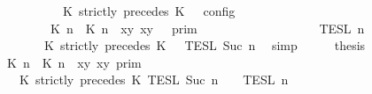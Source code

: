 \begin{isabellebody}
\ \ \ \ \ \ \ \ \ \ \ \ \ \ \ \ \ \ {\isasymturnstile}\ {\isasymPsi}\ {\isasymtriangleright}\ {\isacharparenleft}{\isacharparenleft}K\ strictly\ precedes\ K\ {\isacharhash}\ {\isasymPhi}{\isacharparenright}\ {\isasymrbrakk}\isactrlsub c\isactrlsub o\isactrlsub n\isactrlsub f\isactrlsub i\isactrlsub g\isanewline
\ \ \ \ \ \ \ \ \ \ \ \ \ \ \ \ {\isacharequal}\ {\isasymlbrakk}{\isasymlbrakk}\ {\isacharparenleft}{\isasymlceil}{\isacharhash}\isactrlsup {\isasymle}\ K\ n{\isacharcomma}\ {\isacharhash}\isactrlsup {\isacharless}\ K\ n{\isasymrceil}\ {\isasymin}\ {\isacharparenleft}{\isasymlambda}{\isacharparenleft}x{\isacharcomma}y{\isacharparenright}{\isachardot}\ x{\isasymle}y{\isacharparenright}{\isacharparenright}\ {\isacharhash}\ {\isasymGamma}\ {\isasymrbrakk}{\isasymrbrakk}\isactrlsub p\isactrlsub r\isactrlsub i\isactrlsub m\isanewline
\ \ \ \ \ \ \ \ \ \ \ \ \ \ \ \ {\isasyminter}\ {\isasymlbrakk}{\isasymlbrakk}\ {\isasymPsi}\ {\isasymrbrakk}{\isasymrbrakk}\isactrlsub T\isactrlsub E\isactrlsub S\isactrlsub L\isactrlbsup {\isasymge}\ n\isactrlesup \isanewline
\ \ \ \ \ \ \ \ \ \ \ \ \ \ \ \ {\isasyminter}\ {\isasymlbrakk}{\isasymlbrakk}\ {\isacharparenleft}K\ strictly\ precedes\ K\ {\isacharhash}\ {\isasymPhi}\ {\isasymrbrakk}{\isasymrbrakk}\isactrlsub T\isactrlsub E\isactrlsub S\isactrlsub L\isactrlbsup {\isasymge}\ Suc\ n\isactrlesup {\isacartoucheclose}\ \isamarkupfalse%
\ simp\isanewline
\ \ \isamarkupfalse%
\ \isamarkupfalse%
\ {\isacharquery}thesis\isanewline
\ \ \isamarkupfalse%
\ {\isacharminus}\isanewline
\ \ \ \ \isamarkupfalse%
\ {\isacartoucheopen}{\isasymlbrakk}\ {\isasymlceil}{\isacharhash}\isactrlsup {\isasymle}\ K\ n{\isacharcomma}\ {\isacharhash}\isactrlsup {\isacharless}\ K\ n{\isasymrceil}\ {\isasymin}\ {\isacharparenleft}{\isasymlambda}{\isacharparenleft}x{\isacharcomma}y{\isacharparenright}{\isachardot}\ x{\isasymle}y{\isacharparenright}\ {\isasymrbrakk}\isactrlsub p\isactrlsub r\isactrlsub i\isactrlsub m\isanewline
\ \ \ \ \ \ \ \ \ \ \ \ {\isasyminter}\ {\isasymlbrakk}\ K\ strictly\ precedes\ K\ {\isasymrbrakk}\isactrlsub T\isactrlsub E\isactrlsub S\isactrlsub L\isactrlbsup {\isasymge}\ Suc\ n\isactrlesup \ {\isasyminter}\ {\isasymlbrakk}{\isasymlbrakk}\ {\isasymPsi}\ {\isasymrbrakk}{\isasymrbrakk}\isactrlsub T\isactrlsub E\isactrlsub S\isactrlsub L\isactrlbsup {\isasymge}\ n\isactrlesup \isanewline

\end{isabellebody}
